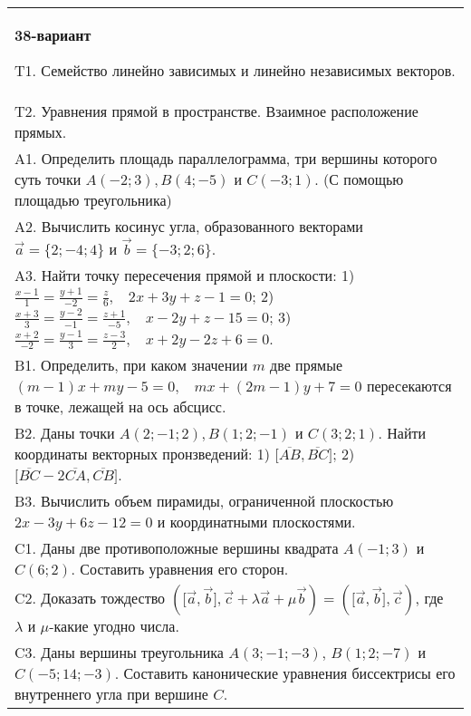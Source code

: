 \documentclass{article}
\begin{document}
\begin{tabular}{m{17cm}}
\textbf{38-вариант}
\newline

T1. 
Семейство линейно зависимых и линейно независимых векторов.
 \\
T2. 
Уравнения прямой в пространстве. Взаимное расположение прямых.
 \\
A1. 
Определить площадь параллелограмма, три вершины которого суть точки \(A( - 2;3),B(4; - 5)\) и \(C( - 3;1)\). (С помощью площадью треугольника)
 \\
A2. 
Вычислить косинус угла, образованного векторами \(\overrightarrow{a} = \{ 2; - 4;4\}\) и \(\overrightarrow{b} = \{ - 3;2;6\}\).
 \\
A3. 
Найти точку пересечения прямой и плоскости: 1) \(\frac{x - 1}{1} = \frac{y + 1}{- 2} = \frac{z}{6},\ \ \ \ 2x + 3y + z - 1 = 0\); 2) \(\frac{x + 3}{3} = \frac{y - 2}{- 1} = \frac{z + 1}{- 5},\ \ \ \ x - 2y + z - 15 = 0\); 3) \(\frac{x + 2}{- 2} = \frac{y - 1}{3} = \frac{z - 3}{2},\ \ \ \ x + 2y - 2z + 6 = 0\).
 \\
B1. 
Определить, при каком значении \(m\) две прямые \((m - 1)x + my - 5 = 0,\ \ \ \ mx + (2m - 1)y + 7 = 0\) пересекаются в точке, лежащей на ось абсцисс.
 \\
B2. 
Даны точки \(A(2; - 1;2),B(1;2; - 1)\) и \(C(3;2;1)\). Найти координаты векторных пронзведений: 1) \(\lbrack\overline{AB},\overline{BC}\rbrack\); 2) \(\lbrack\overline{BC} - 2\overline{CA},\overline{CB}\rbrack\).
 \\
B3. 
Вычислить объем пирамиды, ограниченной плоскостью \(2x - 3y + 6z - 12 = 0\) и координатными плоскостями.
 \\
C1. 
Даны две противоположные вершины квадрата \(A( - 1;3)\) и \(C(6;2)\). Составить уравнения его сторон.
 \\
C2. 
Доказать тождество \((\lbrack\overrightarrow{a},\overrightarrow{b}\rbrack,\overrightarrow{c} + \lambda\overrightarrow{a} + \mu\overrightarrow{b}) = (\lbrack\overrightarrow{a},\overrightarrow{b}\rbrack,\overrightarrow{c})\), где \(\lambda\) и \(\mu\)-какие угодно числа.
 \\
C3. 
Даны вершины треугольника \(A(3; - 1; - 3)\), \(B(1;2; - 7)\) и \(C( - 5;14; - 3)\). Составить канонические уравнения биссектрисы его внутреннего угла при вершине \(C\).
 \\

\end{tabular}
\vspace{1cm}
\end{document}
